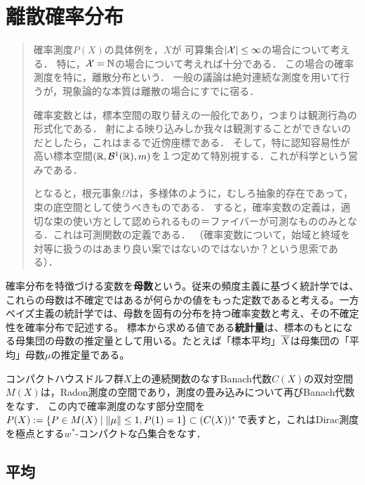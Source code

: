 \documentclass[uplatex,dvipdfmx]{jsreport}
\begin{document}
\chapter{離散確率分布}

\begin{quotation}
    確率測度$P(X)$の具体例を，$X$が
    可算集合$\lvert\mathcal{X}\rvert\le\infty$の場合について考える．
    特に，$\mathcal{X}=\mathbb{N}$の場合について考えれば十分である．
    この場合の確率測度を特に，離散分布という．
    一般の議論は絶対連続な測度を用いて行うが，現象論的な本質は離散の場合にすでに宿る．

    確率変数とは，標本空間の取り替えの一般化であり，つまりは観測行為の形式化である．
    射による映り込みしか我々は観測することができないのだとしたら，これはまるで近傍座標である．
    そして，特に認知容易性が高い標本空間$(\mathbb{R},\mathcal{B}^1(\mathbb{R}),m)$を１つ定めて特別視する．これが科学という営みである．
    
    となると，根元事象$\Omega$は，多様体のように，むしろ抽象的存在であって，束の底空間として使うべきものである．
    すると，確率変数の定義は，適切な束の使い方として認められるもの＝ファイバーが可測なもののみとなる．これは可測関数の定義である．
    （確率変数について，始域と終域を対等に扱うのはあまり良い案ではないのではないか？という思索である）．
\end{quotation}

\begin{remark*}[statistics]
    確率分布を特徴づける変数を\textbf{母数}という。従来の頻度主義に基づく統計学では、これらの母数は不確定ではあるが何らかの値をもった定数であると考える。一方ベイズ主義の統計学では、母数を固有の分布を持つ確率変数と考え、その不確定性を確率分布で記述する。 
    標本から求める値である\textbf{統計量}は、標本のもとになる母集団の母数の推定量として用いる。たとえば「標本平均」$\overline{X}$は母集団の「平均」母数$\mu$の推定量である。
\end{remark*}

\begin{notation}
    コンパクトハウスドルフ群$X$上の連続関数のなすBanach代数$C(X)$の双対空間$M(X)$は，Radon測度の空間であり，測度の畳み込みについて再びBanach代数をなす．
    この内で確率測度のなす部分空間を$P(X):=\left\{P\in M(X)\mid \|\mu\|\le 1,P(1)=1\right\}\subset(C(X))^*$で表すと，これはDirac測度を極点とする$w^*$-コンパクトな凸集合をなす．
\end{notation}

\section{平均}
\end{document}
